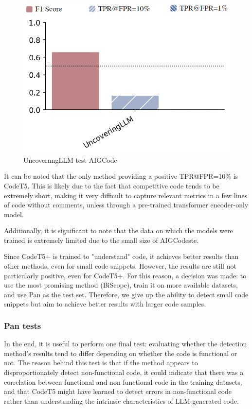 \begin{figure}[H]
    \centering
    \includegraphics[width=0.5\linewidth]{img/TEST/UncovernngLLM/AIG/365f48f93ad10f5ecc7e4f2463f93e709c3fd20daa6db7c4d53cb69f.png}
    \caption{UncovernngLLM test AIGCode}
    \label{fig:c3}
\end{figure}



It can be noted that the only method providing a positive TPR@FPR=10\% is 
CodeT5. This is likely due to the fact that competitive code tends to be 
extremely short, making it very difficult to capture relevant metrics in a 
few lines of code without comments, unless through a pre-trained transformer 
encoder-only model.

Additionally, it is significant to note that the data on which the models were 
trained is extremely limited due to the small size of AIGCodeste.

Since CodeT5+ is trained to "understand" code, it achieves better results than other methods, 
even for small code snippets. However, the results are still not particularly positive, 
even for CodeT5+. For this reason, a decision was made: to use the most promising method 
(BiScope), train it on more available datasets, and use Pan as the test set. Therefore, 
we give up the ability to detect small code snippets but aim to achieve better results 
with larger code samples.



\subsubsection{Pan tests}
In the end, it is useful to perform one final test: 
evaluating whether the detection method's results tend to 
differ depending on whether the code is functional or not. 
The reason behind this test is that if the method appears to 
disproportionately detect non-functional code, it could indicate 
that there was a correlation between functional and non-functional 
code in the training datasets, and that CodeT5 might have learned 
to detect errors in non-functional code rather than understanding 
the intrinsic characteristics of LLM-generated code.



